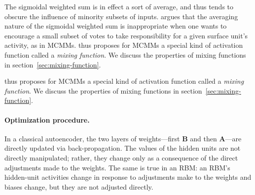 The sigmoidal weighted sum is in effect a sort of average, and thus tends to obscure
the influence of minority subsets of inputs. \citet{saund:94} argues 
that the averaging nature of the sigmoidal weighted sum is inappropriate when one wants to encourage
a small subset of votes to take responsibility for a given surface unit's activity, as in MCMMs.
\citet{saund:94} thus proposes for MCMMs a special kind of activation function called a \emph{mixing function}.
We discuss the properties of mixing functions in 
section~\ref{sec:mixing-function}.



\citet{saund:94} thus proposes for MCMMs a special kind of activation function called a \emph{mixing function}.
We discuss the properties of mixing functions in 
section~\ref{sec:mixing-function}.

\paragraph{Optimization procedure.}  In a classical autoencoder, the two layers of 
weights---first $\textbf{B}$ and then $\textbf{A}$---are directly updated via 
back-propagation. 
The values of the hidden units are not directly manipulated; rather, they change 
only as a 
consequence of the direct adjustments made to the weights. The same is true in an RBM: 
an RBM's hidden-unit activities change in response to adjustments 
make to the weights and biases change, but they are not
adjusted directly.

